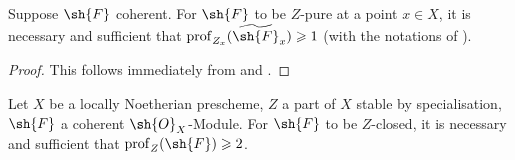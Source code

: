 \begin{corollary}[5.10.4]
\label{IV.5.10.4}
Suppose $\sh{F}$ coherent.
For $\sh{F}$ to be $Z$-pure at a point $x\in X$, it is necessary and sufficient that $\operatorname{prof}_{Z_x}(\widetilde{\sh{F}}_x)\geqslant 1$ (with the notations of ).
\end{corollary}

\begin{proof}
This follows immediately from  and .
\end{proof}

\begin{theorem}[5.10.5]
\label{IV.5.10.5}
Let $X$ be a locally Noetherian prescheme, $Z$ a part of $X$ stable by specialisation, $\sh{F}$ a coherent $\sh{O}_X$-Module.
For $\sh{F}$ to be $Z$-closed, it is necessary and sufficient that $\operatorname{prof}_Z(\sh{F})\geqslant 2$.
\end{theorem}

